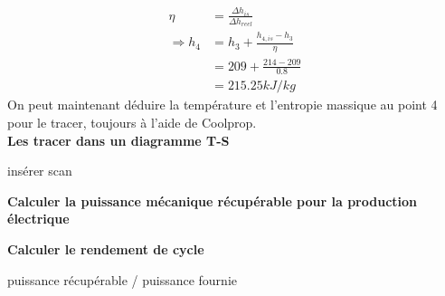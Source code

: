 \documentclass[12pt]{article}
\begin{document}
\begin{align*}
\eta &= \frac{\Delta h_{is}}{\Delta h_{reel}} \\
\Rightarrow h_4 &= h_3 + \frac{h_{4,is}-h_3}{\eta} \\
&= 209 + \frac{214-209}{0.8} \\
&= 215.25 kJ/kg
\end{align*}
On peut maintenant déduire la température et l'entropie massique au point 4 pour le tracer, toujours à l'aide de Coolprop.
\\

\textbf{Les tracer dans un diagramme T-S}

insérer scan

\textbf{Calculer la puissance mécanique récupérable pour la production électrique}

\textbf{Calculer le rendement de cycle}

puissance récupérable / puissance fournie
\end{document}
